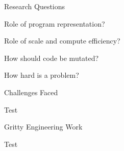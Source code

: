 \documentclass[aspectratio=169]{beamer}
\begin{document}
\begin{frame}{Research Questions}
  \begin{vfilleditems}
    \item {\Huge Role of program representation?}
    \item {\Huge Role of scale and compute efficiency?}
    \item {\Huge How should code be mutated?}
    \item {\Huge How hard is a problem?}
  \end{vfilleditems}
\end{frame}

\begin{frame}{Challenges Faced}
    \begin{vfilleditems}
    \item \Huge Test
    \end{vfilleditems}
\end{frame}

\begin{frame}{Gritty Engineering Work}
    \begin{vfilleditems}
    \item \Huge Test
    \end{vfilleditems}
\end{frame}

\begin{frame}
  \centering
  \printbibliography
\end{frame}
\end{document}
